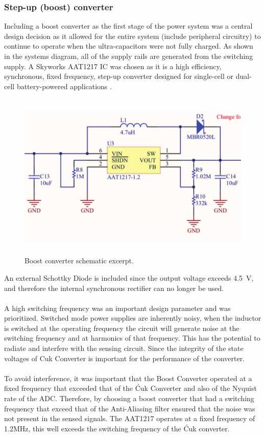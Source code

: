 \subsubsection{Step-up (boost) converter}
Including a boost converter as the first stage of the power system was a central design decision as it allowed for the entire system (include peripheral circuitry) to continue to operate when the ultra-capacitors were not fully charged. As shown in the systems diagram, all of the supply rails are generated from the switching supply. A Skyworks AAT1217 IC was chosen as it is a high efficiency, synchronous, fixed frequency, step-up converter designed for single-cell or dual-cell battery-powered applications \cite{aat1217}.
\begin{figure}[H]
    \centering
    \includegraphics[height = 8cm]{figures/hardware/boost_schematic.pdf}
    \caption{Boost converter schematic excerpt.}
    \label{fig:boost}
\end{figure}
An external Schottky Diode is included since the output voltage exceeds \SI{4.5}{V}, and therefore the internal synchronous rectifier can no longer be used.
\\ \\
A high switching frequency was an important design parameter and was prioritized. Switched mode power supplies are inherently noisy, when the inductor is switched at the operating frequency the circuit will generate noise at the switching frequency and at harmonics of that frequency. This has the potential to radiate and interfere with the sensing circuit. Since the integrity of the state voltages of Cuk Converter is important for the performance of the converter.
\\ \\
To avoid interference, it was important that the Boost Converter operated at a fixed frequency that exceeded that of the \'Cuk Converter and also of the Nyquist rate of the ADC. Therefore, by choosing a boost converter that had a switching frequency that exceed that of the Anti-Aliasing filter ensured that the noise was not present in the sensed signals. The AAT1217 operates at a fixed frequency of 1.2MHz, this well exceeds the switching frequency of the \'Cuk converter.
